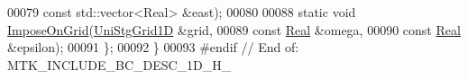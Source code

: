 \begin{DoxyCode}
00079                                      \textcolor{keyword}{const} std::vector<Real> &east);
00080 
00088   \textcolor{keyword}{static} \textcolor{keywordtype}{void} \hyperlink{classmtk_1_1BCDesc1D_a79a659c6a6333af8e51c463cf1ecb0b7}{ImposeOnGrid}(\hyperlink{classmtk_1_1UniStgGrid1D}{UniStgGrid1D} &grid,
00089                            \textcolor{keyword}{const} \hyperlink{group__c01-roots_gac080bbbf5cbb5502c9f00405f894857d}{Real} &omega,
00090                            \textcolor{keyword}{const} \hyperlink{group__c01-roots_gac080bbbf5cbb5502c9f00405f894857d}{Real} &epsilon);
00091 \};
00092 \}
00093 \textcolor{preprocessor}{#endif  // End of: MTK\_INCLUDE\_BC\_DESC\_1D\_H\_}
\end{DoxyCode}
